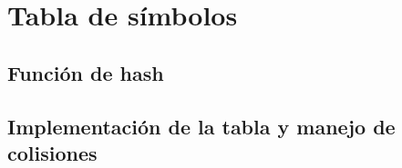 \documentclass[../main.tex]{subfiles}
\begin{document}
\section{Tabla de símbolos}

\subsection{Función de hash}

\subsection{Implementación de la tabla y manejo de colisiones}
\end{document}

